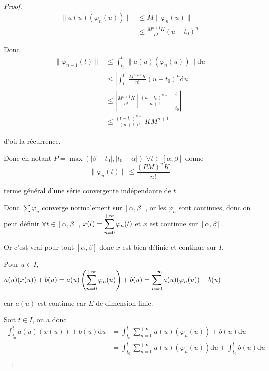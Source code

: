 \begin{proof}
    \begin{align}
        \| a(u)(\varphi_n(u)) \| & \leqslant M \| \varphi_n(u) \| \\
        & \leqslant \frac{M^{n + 1} K}{n!}(u - t_0)^n
    \end{align}

    Donc 
    \begin{align}
        \| \varphi_{n + 1}(t) \| & \leqslant \int_{t_0}^{t} \| a(u)(\varphi_n(u)) \| \mathrm d u \\
        & \leqslant \left| \int_{t_0}^{t} \frac{M^{n + 1}K}{n!} (u - t_0)^n \mathrm d u \right| \\
        & \leqslant \left| \frac{M^{n + 1} K }{n!} \left[ \frac{(u - t_0)^{n + 1}}{n + 1} \right]_{t_0}^{t} \right| \\
        & \leqslant \frac{(t - t_0)^{n + 1}}{(n + 1)!} K M^{n + 1}
    \end{align}

    d'où la récurrence. 

    Donc en notant $P = \max (|\beta - t_0|, |t_0 - \alpha|)$ 
    $\forall t \in [\alpha, \beta]$ donne 
    $$\| \varphi_n(t) \| \leqslant \frac{(PM)^n K }{n!}$$

    terme général d'une série convergente indépendante de $t$. 

    Donc $\sum \varphi_n$ converge normalement sur $[\alpha, \beta]$, or 
    les $\varphi_n$ sont continues, donc on peut définir 
    $\forall t \in [\alpha, \beta]$, $\displaystyle x(t) = \sum_{n = 0}^{+ \infty} \varphi_n(t)$ et 
    $x$ est continue sur $[\alpha, \beta]$.

    Or c'est vrai pour tout $[\alpha, \beta]$ donc $x$ est bien définie et continue sur $I$. 

    Pour $u \in I$, $a(u)(x(u)) + b(u) = \displaystyle a(u) \left( \sum_{n = 0}^{+ \infty} \varphi_n(u) \right) + b(u) = \sum_{n = 0}^{+ \infty} a(u)(\varphi_n(u)) + b(u)$

    car $a(u)$ est continue car $E$ de dimension finie. 

    Soit $t \in I$, on a donc 
    \begin{align}
        \int_{t_0}^{t} a(u)(x(u)) + b(u) \mathrm d u & = \int_{t_0}^{t} \sum_{n = 0}^{+ \infty} a(u)(\varphi_n(u)) + b(u) \mathrm d u \\
        & = \int_{t_0}^{t} \sum_{n = 0}^{+ \infty} a(u)(\varphi_n(u)) \mathrm d u + \int_{t_0}^{t} b(u) \mathrm d u \\
    \end{align}


\end{proof}
